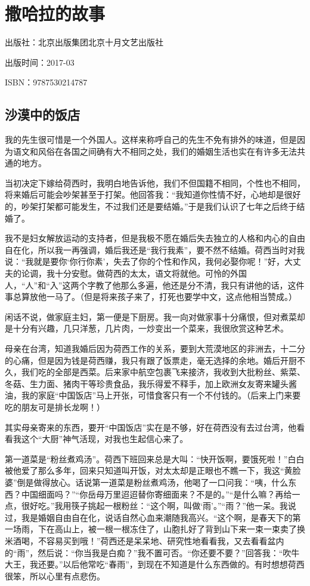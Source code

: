 
\section{撒哈拉的故事}


\par 出版社：北京出版集团北京十月文艺出版社
\par 出版时间：2017-03
\par ISBN：9787530214787

\subsection{沙漠中的饭店}
\par 我的先生很可惜是一个外国人。这样来称呼自己的先生不免有排外的味道，但是因为语文和风俗在各国之间确有大不相同之处，我们的婚姻生活也实在有许多无法共通的地方。
\par 当初决定下嫁给荷西时，我明白地告诉他，我们不但国籍不相同，个性也不相同，将来婚后可能会吵架甚至于打架。他回答我：“我知道你性情不好，心地却是很好的，吵架打架都可能发生，不过我们还是要结婚。”于是我们认识了七年之后终于结婚了。
\par 我不是妇女解放运动的支持者，但是我极不愿在婚后失去独立的人格和内心的自由自在化，所以我一再强调，婚后我还是“我行我素”，要不然不结婚。荷西当时对我说：“我就是要你‘你行你素’，失去了你的个性和作风，我何必娶你呢！”好，大丈夫的论调，我十分安慰。做荷西的太太，语文将就他。可怜的外国人，“人”和“入”这两个字教了他那么多遍，他还是分不清，我只有讲他的话，这件事总算放他一马了。（但是将来孩子来了，打死也要学中文，这点他相当赞成。）
\par 闲话不说，做家庭主妇，第一便是下厨房。我一向对做家事十分痛恨，但对煮菜却是十分有兴趣，几只洋葱，几片肉，一炒变出一个菜来，我很欣赏这种艺术。
\par 母亲在台湾，知道我婚后因为荷西工作的关系，要到大荒漠地区的非洲去，十二分的心痛，但是因为钱是荷西赚，我只有跟了饭票走，毫无选择的余地。婚后开厨不久，我们吃的全部是西菜。后来家中航空包裹飞来接济，我收到大批粉丝、紫菜、冬菇、生力面、猪肉干等珍贵食品，我乐得爱不释手，加上欧洲女友寄来罐头酱油，我的家庭“中国饭店”马上开张，可惜食客只有一个不付钱的。（后来上门来要吃的朋友可是排长龙啊！）
\par 其实母亲寄来的东西，要开“中国饭店”实在是不够，好在荷西没有去过台湾，他看看我这个“大厨”神气活现，对我也生起信心来了。
\par 第一道菜是“粉丝煮鸡汤”。荷西下班回来总是大叫：“快开饭啊，要饿死啦！”白白被他爱了那么多年，回来只知道叫开饭，对太太却是正眼也不瞧一下，我这“黄脸婆”倒是做得放心。话说第一道菜是粉丝煮鸡汤，他喝了一口问我：“咦，什么东西？中国细面吗？”“你岳母万里迢迢替你寄细面来？不是的。”“是什么嘛？再给一点，很好吃。”我用筷子挑起一根粉丝：“这个啊，叫做‘雨’。”“雨？”他一呆。我说过，我是婚姻自由自在化，说话自然心血来潮随我高兴。“这个啊，是春天下的第一场雨，下在高山上，被一根一根冻住了，山胞扎好了背到山下来一束一束卖了换米酒喝，不容易买到哦！”荷西还是呆呆地、研究性地看看我，又去看看盆内的“雨”，然后说：“你当我是白痴？”我不置可否。“你还要不要？”回答我：“吹牛大王，我还要。”以后他常吃“春雨”，到现在不知道是什么东西做的。有时想想荷西很笨，所以心里有点悲伤。
